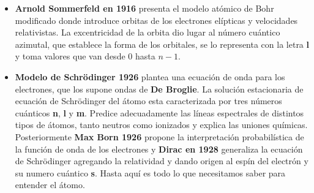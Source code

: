 \begin{itemize}
\item \textbf{Arnold Sommerfeld en 1916} presenta el modelo atómico de Bohr modificado donde introduce orbitas de los electrones elípticas y velocidades relativistas. La excentricidad de la orbita dio lugar al número cuántico azimutal, que establece la forma de los orbitales, se lo representa con la letra \textbf{l} y toma valores que van desde $0$ hasta $n-1$.

\item \textbf{Modelo de Schrödinger 1926} plantea una ecuación de onda para los electrones, que los supone ondas de \textbf{De Broglie}. La solución estacionaria de ecuación de Schrödinger del átomo esta caracterizada por tres números cuánticos \textbf{n}, \textbf{l} y \textbf{m}. Predice adecuadamente las líneas espectrales de distintos tipos de átomos, tanto neutros como ionizados y explica las uniones químicas. Posteriormente \textbf{Max Born 1926} propone la interpretación probabilística de la función de onda de los electrones y \textbf{Dirac en 1928} generaliza la ecuación de Schrödinger agregando la relatividad y dando origen al espín del electrón y su numero cuántico \textbf{s}. Hasta aquí es todo lo que necesitamos saber para entender el átomo.

\end{itemize}


